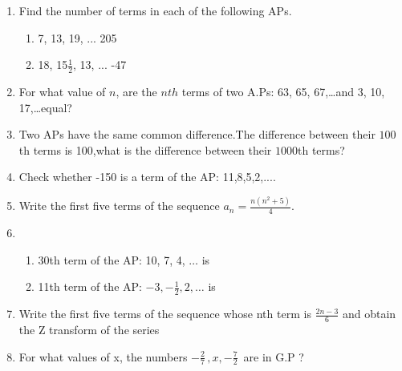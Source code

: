 \begin{enumerate}[label=\thesection.\arabic*,ref=\thesection.\theenumi]
\item Find the number of terms in each of the following APs. 
\begin{enumerate}
    \item 7, 13, 19, ... 205

    \item 18, 15$\frac{1}{2}$, 13, ... -47
\end{enumerate}
\solution



\item For what value of $ n$, are the $ nth$ terms of two A.Ps: 63, 65, 67,\dots and 3, 10, 17,\dots equal?
\solution



\item Two APs have the same common difference.The difference between their $100${th} terms is 100,what is the difference between their $1000${th} terms?

\solution


\item Check whether -150 is a term of the AP: 11,8,5,2,....

 \solution
 
 

 \item Write the first five terms of the sequence \(a_n = \frac{n(n^2+5)}{4}\).

\solution



\item
\begin{enumerate}
\item 30th term of the AP: 10, 7, 4, $\ldots$ is 
\item 11th term of the AP: $-3, -\frac{1}{2}, 2, \ldots$ is
\end{enumerate}
\solution



\item Write the first five terms of the sequence whose nth term is $\frac{2n-3}{6}$ and obtain the Z transform of the series
\solution


 \item For what values of x, the numbers $-\frac{2}{7}\,,x,-\frac{7}{2}\,$ are in G.P ?

\solution




\end{enumerate}
